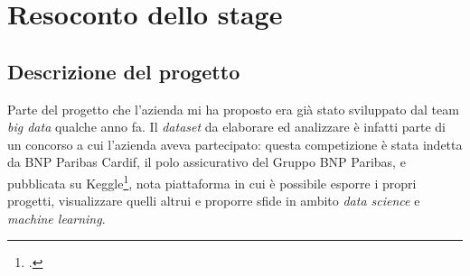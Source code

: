 


\chapter{Resoconto dello stage}
\label{cap:resoconto-stage}

\section{Descrizione del progetto}
Parte del progetto che l'azienda mi ha proposto era già stato sviluppato dal team \textit{big data} qualche anno fa.
Il \textit{dataset} da elaborare ed analizzare è infatti parte di un concorso a cui l'azienda aveva partecipato: questa competizione è stata indetta da BNP Paribas Cardif, il polo assicurativo del Gruppo BNP Paribas, e pubblicata su Keggle\footcite{https://www.kaggle.com/}, nota piattaforma in cui è possibile esporre i propri progetti, visualizzare quelli altrui e proporre sfide in ambito \textit{data science} e \textit{machine learning}.

